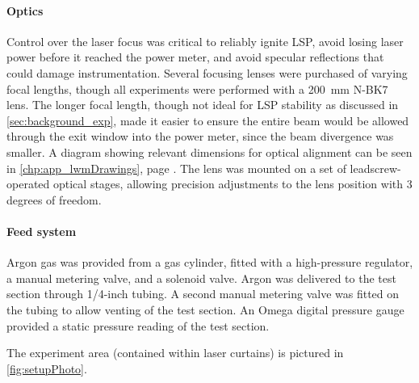                 \paragraph{Optics} Control over the laser focus was critical to reliably ignite LSP, avoid losing laser power before it reached the power meter, and avoid specular reflections that could damage instrumentation. Several focusing lenses were purchased of varying focal lengths, though all experiments were performed with a \qty{200}{mm} N-BK7 lens. The longer focal length, though not ideal for LSP stability as discussed in \autoref{sec:background_exp}, made it easier to ensure the entire beam would be allowed through the exit window into the power meter, since the beam divergence was smaller. A diagram showing relevant dimensions for optical alignment can be seen in \autoref{chp:app_lwmDrawings}, page \pageref*{chp:app_optics}. The lens was mounted on a set of leadscrew-operated optical stages, allowing precision adjustments to the lens position with 3 degrees of freedom.

                \paragraph{Feed system} Argon gas was provided from a gas cylinder, fitted with a high-pressure regulator, a manual metering valve, and a solenoid valve. Argon was delivered to the test section through 1/4-inch tubing. A second manual metering valve was fitted on the tubing to allow venting of the test section. An Omega digital pressure gauge provided a static pressure reading of the test section.

                The experiment area (contained within laser curtains) is pictured in \autoref{fig:setupPhoto}.

